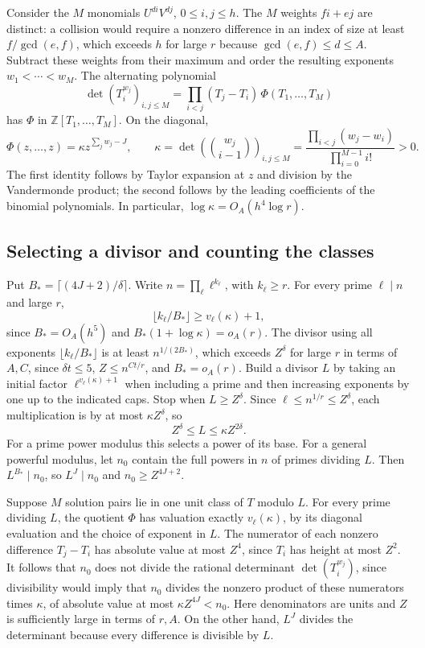 \documentclass[11pt,reqno]{amsart}
\begin{document}
Consider the \(M\) monomials \(U^{di}V^{dj}\), \(0\le i,j\le h\).
The \(M\) weights \(fi+ej\) are distinct: a collision would require
a nonzero difference in an index of size at least \(f/\gcd(e,f)\),
which exceeds \(h\) for large \(r\) because \(\gcd(e,f)\le d\le A\).
Subtract these weights from their maximum and order the resulting
exponents \(w_1<\cdots<w_M\). The alternating polynomial
\[
            \det(T_i^{w_j})_{i,j\le M}
              =\prod_{i<j}(T_j-T_i)\,\Phi(T_1,\ldots,T_M)
\]
has \(\Phi\) in \(\mathbb Z[T_1,\ldots,T_M]\).
On the diagonal,
\[
 \Phi(z,\ldots,z)=\kappa z^{\sum_jw_j-J},\qquad
 \kappa=\det\left(\binom{w_j}{i-1}\right)_{i,j\le M}
        =\frac{\prod_{i<j}(w_j-w_i)}{\prod_{i=0}^{M-1}i!}>0 .
\]
The first identity follows by Taylor expansion at \(z\) and
division by the Vandermonde product; the second follows by
the leading coefficients of the binomial polynomials.
In particular, \(\log\kappa=O_A(h^4\log r)\).

\subsection{Selecting a divisor and counting the classes}
Put \(B_*=\lceil(4J+2)/\delta\rceil\). Write
\(n=\prod_\ell\ell^{k_\ell}\), with \(k_\ell\ge r\).
For every prime \(\ell\mid n\) and large \(r\),
\[
            \lfloor k_\ell/B_*\rfloor\ge v_\ell(\kappa)+1,
\]
since \(B_*=O_A(h^5)\) and \(B_*(1+\log\kappa)=o_A(r)\).
The divisor using all exponents \(\lfloor k_\ell/B_*\rfloor\)
is at least \(n^{1/(2B_*)}\), which exceeds \(Z^\delta\)
for large \(r\) in terms of \(A,C\), since
\(\delta t\le5\), \(Z\le n^{Ct/r}\), and \(B_*=o_A(r)\).
Build a divisor \(L\) by taking an initial factor
\(\ell^{v_\ell(\kappa)+1}\) when including a prime and then
increasing exponents by one up to the indicated caps. Stop when
\(L\ge Z^\delta\). Since \(\ell\le n^{1/r}\le Z^\delta\),
each multiplication is by at most \(\kappa Z^\delta\), so
\[
                     Z^\delta\le L\le\kappa Z^{2\delta}.
\]
For a prime power modulus this selects a power of its base.
For a general powerful modulus, let \(n_0\) contain the full
powers in \(n\) of primes dividing \(L\). Then \(L^{B_*}\mid n_0\),
so \(L^J\mid n_0\) and \(n_0\ge Z^{4J+2}\).

Suppose \(M\) solution pairs lie in one unit class of \(T\) modulo
\(L\). For every prime dividing \(L\), the quotient \(\Phi\)
has valuation exactly \(v_\ell(\kappa)\), by its diagonal
evaluation and the choice of exponent in \(L\). The numerator of
each nonzero difference \(T_j-T_i\) has absolute value at most
\(Z^4\), since \(T_i\) has height at most \(Z^2\).
It follows that \(n_0\) does not divide the rational determinant
\(\det(T_i^{w_j})\), since divisibility would imply that \(n_0\)
divides the nonzero product of these numerators times \(\kappa\),
of absolute value at most \(\kappa Z^{4J}<n_0\).
Here denominators are units and \(Z\) is sufficiently large
in terms of \(r,A\). On the other hand, \(L^J\) divides the
determinant because every difference is divisible by \(L\).
\end{document}
